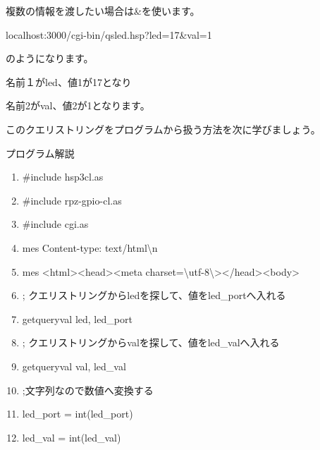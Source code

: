 \documentclass[a4paper,12pt,dvipdfmx]{jarticle}
\begin{document}
複数の情報を渡したい場合は\&を使います。

localhost:3000/cgi-bin/qsled.hsp?led=17\&val=1

のようになります。

名前１がled、値1が17となり

名前2がval、値2が1となります。

このクエリストリングをプログラムから扱う方法を次に学びましょう。

\clearpage
プログラム解説



\centering
\begin{boxedminipage}{16.538cm}
	\begin{enumerate}
	\baselineskip 10pt
	\setlength{\itemsep}{0cm}
	\item\#include {\textquotedbl}hsp3cl.as{\textquotedbl}

	\item\#include {\textquotedbl}rpz-gpio-cl.as{\textquotedbl}

	\item\#include {\textquotedbl}cgi.as{\textquotedbl}

	\item mes {\textquotedbl}Content-type: text/html{\textbackslash}n{\textquotedbl}

	\item mes {\textquotedbl}{\textless}html{\textgreater}{\textless}head{\textgreater}{\textless}meta
		charset={\textbackslash}{\textquotedbl}utf-8{\textbackslash}{\textquotedbl}{\textgreater}{\textless}/head{\textgreater}{\textless}body{\textgreater}{\textquotedbl}

	\item; クエリストリングからledを探して、値をled\_portへ入れる

	\item getqueryval {\textquotedbl}led{\textquotedbl}, led\_port

	\item ; クエリストリングからvalを探して、値をled\_valへ入れる

	\item getqueryval {\textquotedbl}val{\textquotedbl}, led\_val

	\item ;文字列なので数値へ変換する

	\item led\_port = int(led\_port)

	\item led\_val = int(led\_val)



\end{enumerate}
\end{boxedminipage}
\end{document}
